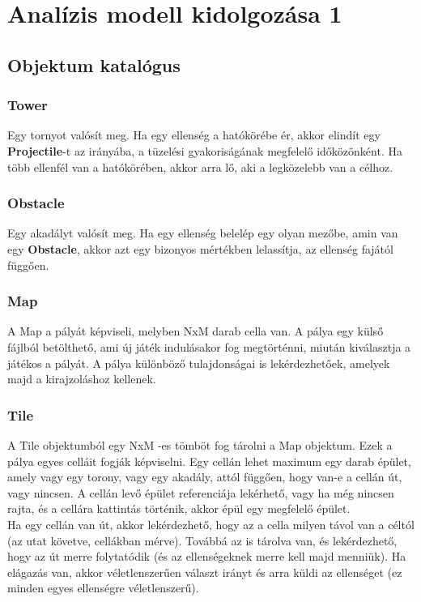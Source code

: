 %
\chapter{Analízis modell kidolgozása 1}

\thispagestyle{fancy}

\section{Objektum katalógus}


\subsection{Tower}
Egy tornyot valósít meg. Ha egy ellenség a hatókörébe ér, akkor elindít egy \textbf{Projectile}-t az irányába, a tüzelési gyakoriságának megfelelő időközönként. Ha több ellenfél van a hatókörében, akkor arra lő, aki a legközelebb van a célhoz.

\subsection{Obstacle}
Egy akadályt valósít meg. Ha egy ellenség belelép egy olyan mezőbe, amin van egy \textbf{Obstacle}, akkor azt egy bizonyos mértékben lelassítja, az ellenség fajától függően.

\subsection{Map}
A Map a pályát képviseli, melyben NxM darab cella van. A pálya egy külső fájlból betölthető, ami új játék indulásakor fog megtörténni, miután kiválasztja a játékos a pályát. A pálya különböző tulajdonságai is lekérdezhetőek, amelyek majd a kirajzoláshoz kellenek.

\subsection{Tile}
A Tile objektumból egy NxM -es tömböt fog tárolni a Map objektum. Ezek a pálya egyes celláit fogják képviselni. Egy cellán lehet maximum egy darab épület, amely vagy egy torony, vagy egy akadály, attól függően, hogy van-e a cellán út, vagy nincsen. A cellán levő épület referenciája lekérhető, vagy ha még nincsen rajta, és a cellára kattintás történik, akkor épül egy megfelelő épület.\\
Ha egy cellán van út, akkor lekérdezhető, hogy az a cella milyen távol van a céltól (az utat követve, cellákban mérve). Továbbá az is tárolva van, és lekérdezhető, hogy az út merre folytatódik (és az ellenségeknek merre kell majd menniük). Ha elágazás van, akkor véletlenszerűen választ irányt és arra küldi az ellenséget (ez minden egyes ellenségre véletlenszerű).

